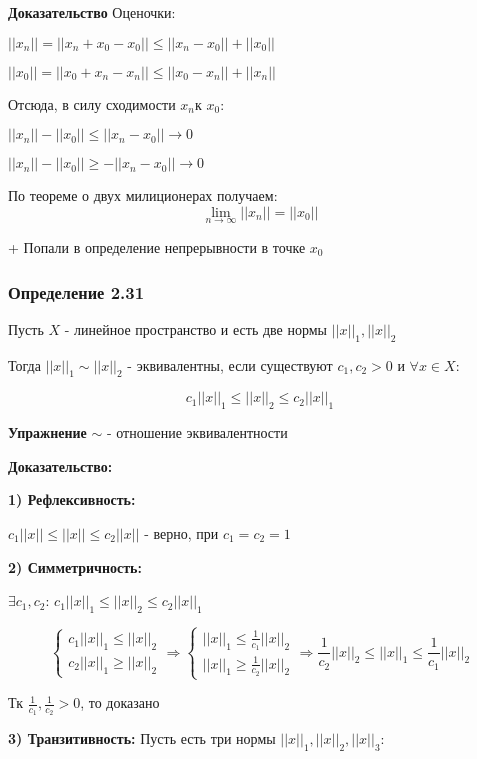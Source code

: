 \documentclass[12pt]{article}
\begin{document}
\textbf{Доказательство}		
	Оценочки:
	
	$||x_n|| = ||x_n + x_0 - x_0|| \leq ||x_n - x_0|| + ||x_0||$
	
	$||x_0|| = ||x_0 + x_n - x_n|| \leq ||x_0 - x_n|| + ||x_n||$
	
	Отсюда, в силу сходимости ${x_n}$к $x_0$:
	
	$||x_n|| - ||x_0|| \leq ||x_n - x_0|| \to 0 $
	
	$||x_n|| - ||x_0|| \ge -||x_n - x_0|| \to 0$
	
	По теореме о двух милиционерах получаем: 	$$\lim_{n \to \infty} ||x_n|| = ||x_0||$$
	
	+ Попали в определение непрерывности в точке $x_0$
	
\subsubsection*{Определение 2.31}
	Пусть $X$ - линейное пространство и есть две нормы $||x||_1, ||x||_2$
	
Тогда $||x||_1 \sim ||x||_2$ - эквивалентны, если существуют $c_1, c_2 > 0$ и $\forall x \in X$:

	$$c_1||x||_1 \leq ||x||_2 \leq c_2||x||_1$$
		
\textbf{Упражнение}		
	$\sim$ - отношение эквивалентности

\textbf{Доказательство:}

	\textbf{1) Рефлексивность:}
		
		$c_1||x|| \leq ||x|| \leq c_2||x||$ - верно, при $c_1 = c_2 = 1$
		
	\textbf{2)	Симметричность:}
	
		 $\exists c_1, c_2$:
		$c_1||x||_1 \leq ||x||_2 \leq c_2||x||_1$
	
$$
\begin{cases}
   c_1||x||_1 \leq ||x||_2 \\
   c_2||x||_1  \ge ||x||_2  
\end{cases}
\Rightarrow
\begin{cases}
   ||x||_1 \leq \frac{1}{c_1}||x||_2 \\
   ||x||_1  \ge \frac{1}{c_2}||x||_2  
   
\end{cases}
\Rightarrow
\frac{1}{c_2}||x||_2 \leq ||x||_1 \leq \frac{1}{c_1}||x||_2
$$

Тк $\frac{1}{c_1} , \frac{1}{c_2} > 0$, то доказано

			
	\textbf{3)	Транзитивность:}
	Пусть есть три нормы $||x||_1 , ||x||_2 , ||x||_3$:
	
\end{document}

